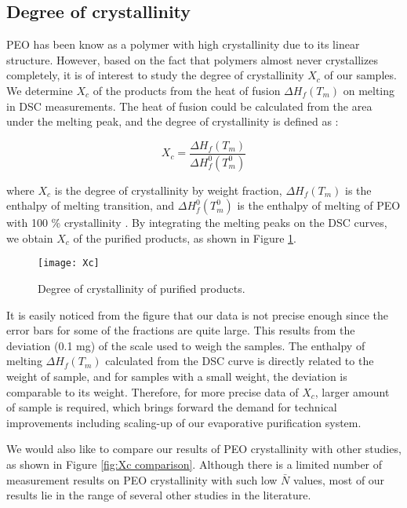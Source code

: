 \subsection{Degree of crystallinity}

PEO has been know as a polymer with high crystallinity due to its linear structure. However, based on the fact that polymers almost never crystallizes completely, it is of interest to study the degree of crystallinity $X_{c}$ of our samples. We determine $X_{c}$ of the products from the heat of fusion $\Delta H_{f} (T_{m})$ on melting in DSC measurements. The heat of fusion could be calculated from the area under the melting peak, and the degree of crystallinity is defined as \cite{Kong2002}:

\begin{equation}
\label{eqn_Xc}
X_{c} = \dfrac{\Delta H_{f} (T_{m})}{\Delta H_{f}^{0} (T_{m}^{0})}
\end{equation}

\noindent
where $X_{c}$ is the degree of crystallinity by weight fraction, $\Delta H_{f} (T_{m})$ is the enthalpy of melting transition, and $\Delta H_{f}^{0} (T_{m}^{0})$ is the enthalpy of melting of PEO with 100 \% crystallinity \cite{Yave2010}. By integrating the melting peaks on the DSC curves, we obtain $X_{c}$ of the purified products, as shown in Figure \ref{fig:Xc}.

\begin{figure}[H]
\center
\texttt{[image: Xc]}
\caption{Degree of crystallinity of purified products.}
\label{fig:Xc}
\end{figure}

It is easily noticed from the figure that our data is not precise enough since the error bars for some of the fractions are quite large. This results from the deviation (0.1 mg) of the scale used to weigh the samples. The enthalpy of melting $\Delta H_{f} (T_{m})$ calculated from the DSC curve is directly related to the weight of sample, and for samples with a small weight, the deviation is comparable to its weight. Therefore, for more precise data of $X_{c}$, larger amount of sample is required, which brings forward the demand for technical improvements including scaling-up of our evaporative purification system.

We would also like to compare our results of PEO crystallinity with other studies, as shown in Figure \ref{fig:Xc comparison}. Although there is a limited number of measurement results on PEO crystallinity with such low $\bar{N}$ values, most of our results lie in the range of several other studies in the literature.

